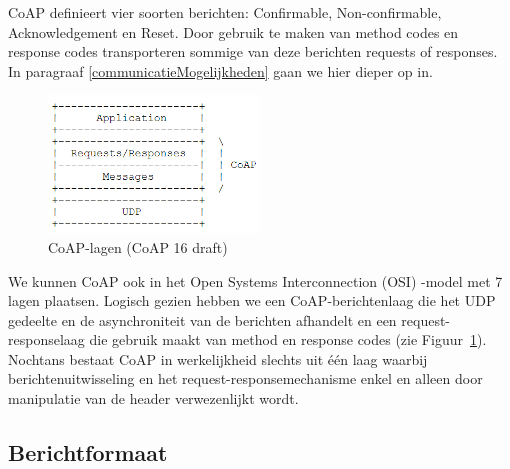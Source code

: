 CoAP definieert vier soorten berichten: Confirmable, Non-confirmable, Acknowledgement en Reset. Door gebruik te maken van method codes en response codes transporteren sommige van deze berichten requests of responses. In paragraaf \ref{communicatieMogelijkheden} gaan we hier dieper op in.\\

\begin{figure}
\vspace{-10pt}
\includegraphics[width=0.5\textwidth]{fig/CoAPLaag}
\vspace{-30pt}
\caption{CoAP-lagen (CoAP 16 draft)}
\vspace{-5pt}
\label{fig:CoAPLaag}
\end{figure}
We kunnen CoAP ook in het Open Systems Interconnection (OSI) -model  met 7 lagen plaatsen. Logisch gezien hebben we een CoAP-berichtenlaag die het UDP gedeelte en de asynchroniteit van de berichten afhandelt en een request-responselaag die gebruik maakt van method en response codes (zie Figuur~\ref{fig:CoAPLaag}). Nochtans bestaat CoAP in werkelijkheid slechts uit \'{e}\'{e}n laag waarbij berichtenuitwisseling en het request-responsemechanisme enkel en alleen door manipulatie van de header verwezenlijkt wordt.

\subsection{Berichtformaat}

